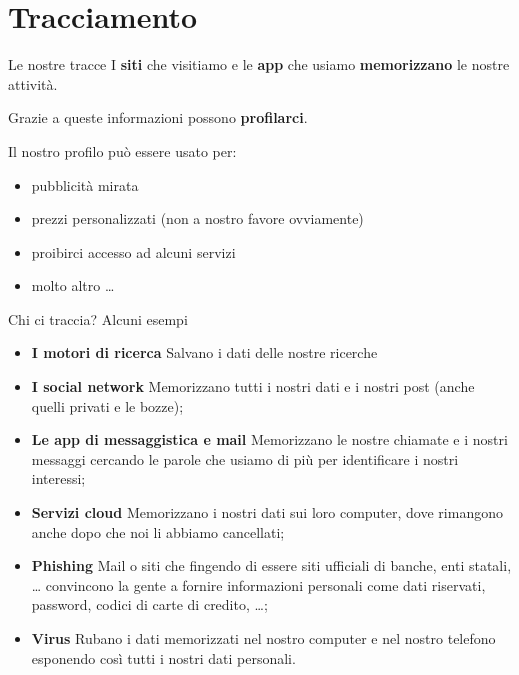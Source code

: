 
\section{Tracciamento}

\begin{myframe}{Le nostre tracce}
  I \textbf{siti} che visitiamo e le \textbf{app} che usiamo \textbf{memorizzano} le nostre attività.

  \pause\medskip
  Grazie a queste informazioni possono \textbf{profilarci}.

  \pause\medskip
  Il nostro profilo può essere usato per:
  \begin{itemize}[<+->]
    \item pubblicità mirata
    \item prezzi personalizzati (non a nostro favore ovviamente)
    \item proibirci accesso ad alcuni servizi
    \item molto altro \dots
  \end{itemize}

\end{myframe}

\begin{myframe}{Chi ci traccia?}
  Alcuni esempi \pause
  \begin{itemize}[<+->]
    \item \textbf{I motori di ricerca} Salvano i dati delle nostre ricerche
    \item \textbf{I social network} Memorizzano tutti i nostri dati e i nostri post (anche quelli privati e le bozze);
    \item \textbf{Le app di messaggistica e mail} Memorizzano le nostre chiamate e i nostri messaggi cercando le parole che usiamo di più per identificare i nostri interessi;
    \item \textbf{Servizi cloud} Memorizzano i nostri dati sui loro computer, dove rimangono anche dopo che noi li abbiamo cancellati;
    \item \textbf{Phishing} Mail o siti che fingendo di essere siti ufficiali di banche, enti statali, \dots{} convincono la gente a fornire informazioni personali come dati riservati, password, codici di carte di credito, \dots;
    \item \textbf{Virus} Rubano i dati memorizzati nel nostro computer e nel nostro telefono esponendo così tutti i nostri dati personali.
  \end{itemize}
\end{myframe}

